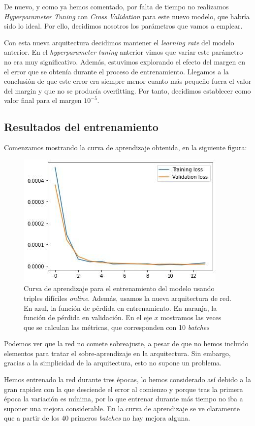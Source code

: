 \documentclass[11pt]{article}
\begin{document}
De nuevo, y como ya hemos comentado, por falta de tiempo no realizamos \emph{Hyperparameter Tuning} con \emph{Cross Validation} para este nuevo modelo, que habría sido lo ideal. Por ello, decidimos nosotros los parámetros que vamos a emplear.

Con esta nueva arquitectura decidimos mantener el \emph{learning rate} del modelo anterior. En el \emph{hyperparameter tuning} anterior vimos que variar este parámetro no era muy significativo. Además, estuvimos explorando el efecto del margen en el error que se obtenía durante el proceso de entrenamiento. Llegamos a la conclusión de que este error era siempre menor cuanto más pequeño fuera el valor del margin y que no se producía overfitting. Por tanto, decidimos establecer como valor final para el margen $10^{-5}$.

\subsection{Resultados del entrenamiento}

Comenzamos mostrando la curva de aprendizaje obtenida, en la siguiente figura:

\begin{figure}[H]
    \centering
    \includegraphics[width = 0.5 \textwidth]{triples_light_curva_aprendizje}
    \caption{Curva de aprendizaje para el entrenamiento del modelo usando triples difíciles \emph{online}. Además, usamos la nueva arquitectura de red. En azul, la función de pérdida en entrenamiento. En naranja, la función de pérdida en validación. En el eje $x$ mostramos las veces que se calculan las métricas, que corresponden con 10 \emph{batches}}
\end{figure}

Podemos ver que la red no comete sobreajuste, a pesar de que no hemos incluido elementos para tratar el sobre-aprendizaje en la arquitectura. Sin embargo, gracias a la simplicidad de la arquitectura, esto no supone un problema.

Hemos entrenado la red durante tres épocas, lo hemos considerado así debido a la gran rapidez con la que desciende el error  al comienzo y porque tras la primera época la variación es mínima, por lo que entrenar durante más tiempo no iba a suponer una mejora considerable. En la curva de aprendizaje se ve claramente que a partir de los 40 primeros \emph{batches} no hay mejora alguna.
\end{document}
